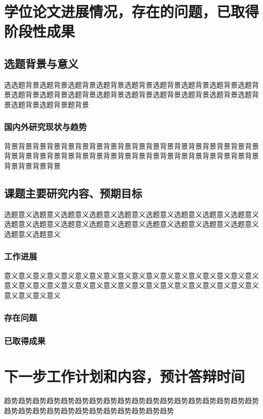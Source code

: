 \section{学位论文进展情况，存在的问题，已取得阶段性成果}

\subsection{选题背景与意义}

选选题背景选题背景选题背景选题背景选题背景选题背景选题背景选题背景选题背景选题背景选题背景选题背景选题背景选题背景选题背景选题背景选题背景选题背景选题背景选题背景题背景~\cite{betts2005aging}

\subsubsection{国内外研究现状与趋势}

背景背景背景背景背景背景背景背景背景背景背景背景背景背景背景背景背景背景背景背景背景背景背景背景背景背景背景背景背景背景背景背景背景背景背景背景背景背景背景背景

\subsection{课题主要研究内容、预期目标}

选题意义选题意义选题意义选题意义选题意义选题意义选题意义选题意义选题意义选题意义选题意义选题意义选题意义选题意义选题意义选题意义选题意义选题意义选题意义选题意义

\subsubsection{工作进展}

意义意义意义意义意义意义意义意义意义意义意义意义意义意义意义意义意义意义意义意义意义意义意义意义意义意义意义意义意义意义意义意义意义意义意义意义意义意义意义意义

\subsubsection{存在问题}

\subsubsection{已取得成果}

\section{下一步工作计划和内容，预计答辩时间}

趋势趋势趋势趋势趋势趋势趋势趋势趋势趋势趋势趋势趋势趋势趋势趋势趋势趋势趋势趋势趋势趋势趋势趋势趋势趋势趋势趋势趋势趋势




\nocite{}%
